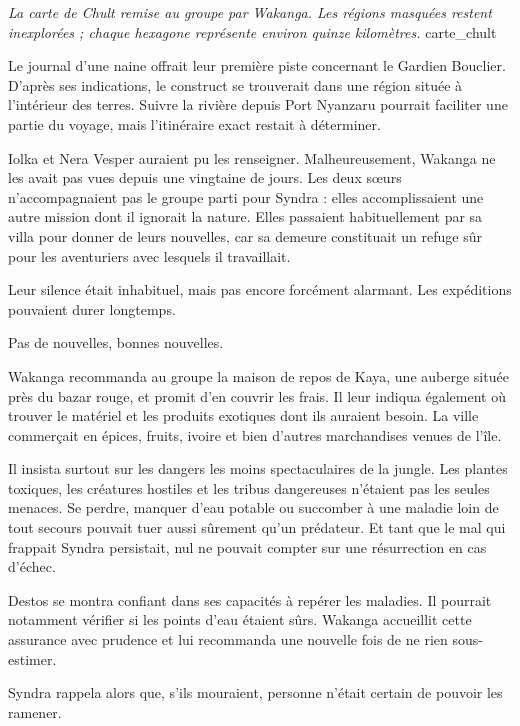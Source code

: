 {\textit{La carte de Chult remise au groupe par Wakanga. Les régions masquées restent inexplorées ; chaque hexagone représente environ quinze kilomètres.}}
{carte_chult}

Le journal d'une naine offrait leur première piste concernant le Gardien Bouclier. D'après ses indications, le construct se trouverait dans une région située à l'intérieur des terres. Suivre la rivière depuis Port Nyanzaru pourrait faciliter une partie du voyage, mais l'itinéraire exact restait à déterminer.

Iolka et Nera Vesper auraient pu les renseigner. Malheureusement, Wakanga ne les avait pas vues depuis une vingtaine de jours. Les deux sœurs n'accompagnaient pas le groupe parti pour Syndra : elles accomplissaient une autre mission dont il ignorait la nature. Elles passaient habituellement par sa villa pour donner de leurs nouvelles, car sa demeure constituait un refuge sûr pour les aventuriers avec lesquels il travaillait.

Leur silence était inhabituel, mais pas encore forcément alarmant. Les expéditions pouvaient durer longtemps.

\begin{narrateur}
Pas de nouvelles, bonnes nouvelles.
\end{narrateur}

Wakanga recommanda au groupe la maison de repos de Kaya, une auberge située près du bazar rouge, et promit d'en couvrir les frais. Il leur indiqua également où trouver le matériel et les produits exotiques dont ils auraient besoin. La ville commerçait en épices, fruits, ivoire et bien d'autres marchandises venues de l'île.

Il insista surtout sur les dangers les moins spectaculaires de la jungle. Les plantes toxiques, les créatures hostiles et les tribus dangereuses n'étaient pas les seules menaces. Se perdre, manquer d'eau potable ou succomber à une maladie loin de tout secours pouvait tuer aussi sûrement qu'un prédateur. Et tant que le mal qui frappait Syndra persistait, nul ne pouvait compter sur une résurrection en cas d'échec.

Destos se montra confiant dans ses capacités à repérer les maladies. Il pourrait notamment vérifier si les points d'eau étaient sûrs. Wakanga accueillit cette assurance avec prudence et lui recommanda une nouvelle fois de ne rien sous-estimer.

Syndra rappela alors que, s'ils mouraient, personne n'était certain de pouvoir les ramener.

